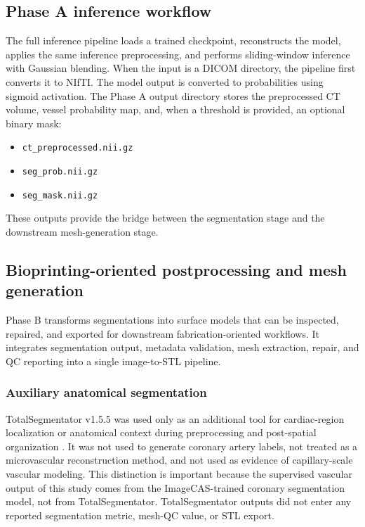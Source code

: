 \documentclass[anonymous]{iopjournal}
\begin{document}
\subsection{Phase A inference workflow}

The full inference pipeline loads a trained checkpoint, reconstructs the model, applies the same inference preprocessing, and performs sliding-window inference with Gaussian blending. When the input is a DICOM directory, the pipeline first converts it to NIfTI. The model output is converted to probabilities using sigmoid activation. The Phase A output directory stores the preprocessed CT volume, vessel probability map, and, when a threshold is provided, an optional binary mask:
\begin{itemize}
    \item \texttt{ct\_preprocessed.nii.gz}
    \item \texttt{seg\_prob.nii.gz}
    \item \texttt{seg\_mask.nii.gz}
\end{itemize}
These outputs provide the bridge between the segmentation stage and the downstream mesh-generation stage.

\subsection{Bioprinting-oriented postprocessing and mesh generation}

Phase B transforms segmentations into surface models that can be inspected, repaired, and exported for downstream fabrication-oriented workflows. It integrates segmentation output, metadata validation, mesh extraction, repair, and QC reporting into a single image-to-STL pipeline.

\subsubsection{Auxiliary anatomical segmentation}

TotalSegmentator v1.5.5 was used only as an additional tool for cardiac-region localization or anatomical context during preprocessing and post-spatial organization \cite{wasserthal2023}. It was not used to generate coronary artery labels, not treated as a microvascular reconstruction method, and not used as evidence of capillary-scale vascular modeling. This distinction is important because the supervised vascular output of this study comes from the ImageCAS-trained coronary segmentation model, not from TotalSegmentator. TotalSegmentator outputs did not enter any reported segmentation metric, mesh-QC value, or STL export.
\end{document}
